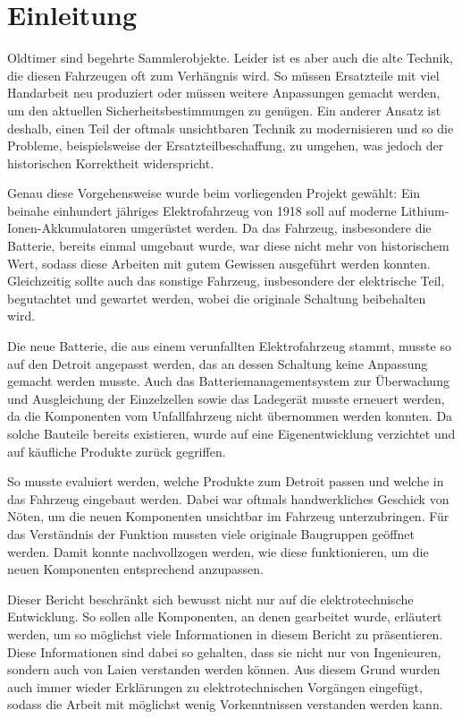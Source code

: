 \chapter{Einleitung}

Oldtimer sind begehrte Sammlerobjekte. Leider ist es aber auch die alte Technik, die diesen Fahrzeugen oft zum Verhängnis wird. So müssen Ersatzteile mit viel Handarbeit neu produziert oder müssen weitere Anpassungen gemacht werden, um den aktuellen Sicherheitsbestimmungen zu genügen. Ein anderer Ansatz ist deshalb, einen Teil der oftmals unsichtbaren Technik zu modernisieren und so die Probleme, beispielsweise der Ersatzteilbeschaffung, zu umgehen, was jedoch der historischen Korrektheit widerspricht.

Genau diese Vorgehensweise wurde beim vorliegenden Projekt gewählt: Ein beinahe einhundert jähriges Elektrofahrzeug von 1918 soll auf moderne Lithium-Ionen-Akkumulatoren umgerüstet werden. Da das Fahrzeug, insbesondere die Batterie, bereits einmal umgebaut wurde, war diese nicht mehr von historischem Wert, sodass diese Arbeiten mit gutem Gewissen ausgeführt werden konnten. Gleichzeitig sollte auch das sonstige Fahrzeug, insbesondere der elektrische Teil, begutachtet und gewartet werden, wobei die originale Schaltung beibehalten wird.

Die neue Batterie, die aus einem verunfallten Elektrofahrzeug stammt, musste so auf den Detroit angepasst werden, das an dessen Schaltung keine Anpassung gemacht werden musste. Auch das Batteriemanagementsystem zur Überwachung und Ausgleichung der Einzelzellen sowie das Ladegerät musste erneuert werden, da die Komponenten vom Unfallfahrzeug nicht übernommen werden konnten. Da solche Bauteile bereits existieren, wurde auf eine Eigenentwicklung verzichtet und auf käufliche Produkte zurück gegriffen.

So musste evaluiert werden, welche Produkte zum Detroit passen und welche in das Fahrzeug eingebaut werden. Dabei war oftmals handwerkliches Geschick von Nöten, um die neuen Komponenten unsichtbar im Fahrzeug unterzubringen. Für das Verständnis der Funktion mussten viele originale Baugruppen geöffnet werden. Damit konnte nachvollzogen werden, wie diese funktionieren, um die neuen Komponenten entsprechend anzupassen.

Dieser Bericht beschränkt sich bewusst nicht nur auf die elektrotechnische Entwicklung. So sollen alle Komponenten, an denen gearbeitet wurde, erläutert werden, um so möglichst viele Informationen in diesem Bericht zu präsentieren. Diese Informationen sind dabei so gehalten, dass sie nicht nur von Ingenieuren, sondern auch von Laien verstanden werden können. Aus diesem Grund wurden auch immer wieder Erklärungen zu elektrotechnischen Vorgängen eingefügt, sodass die Arbeit mit möglichst wenig Vorkenntnissen verstanden werden kann.